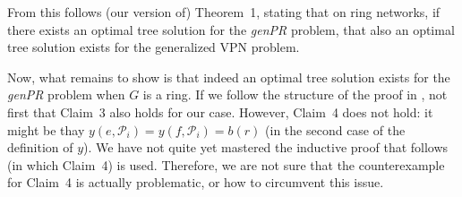 \documentclass[11pt]{article}
\theoremstyle{definition}
\begin{document}
    From this follows (our version of) Theorem~1, stating that on ring networks, if there exists an optimal tree solution for the \emph{genPR} problem, that also an optimal tree solution exists for the generalized VPN problem.

    Now, what remains to show is that indeed an optimal tree solution exists for the \emph{genPR} problem when $G$ is a ring.
    If we follow the structure of the proof in \cite{grandoni2008short}, not first that Claim~3 also holds for our case.
    However, Claim~4 does not hold: it might be thay $y(e, \mathcal P_i) = y(f, \mathcal P_i) = b(r)$ (in the second case of the definition of $y$).
    We have not quite yet mastered the inductive proof that follows (in which Claim~4) is used.
    Therefore, we are not sure that the counterexample for Claim~4 is actually problematic, or how to circumvent this issue.

    
    
\end{document}
